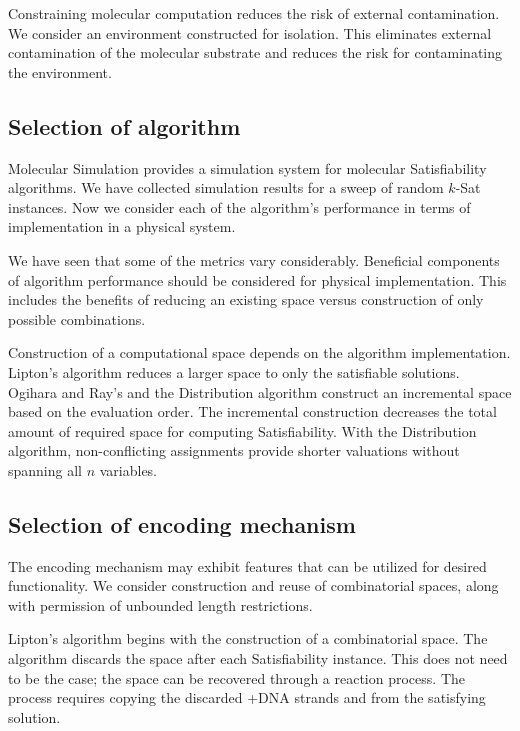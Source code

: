   Constraining molecular computation reduces the risk of external contamination.  We consider an environment constructed for isolation.  This eliminates external contamination of the molecular substrate and reduces the risk for contaminating the environment.

			
		\subsection{Selection of algorithm}
		
Molecular Simulation provides a simulation system for molecular {\sc Satisfiability} algorithms.  We have collected simulation results for a sweep of random $k$-{\sc Sat} instances.  Now we consider each of the algorithm's performance in terms of implementation in a physical system.
			
We have seen that some of the metrics vary considerably.  Beneficial components of algorithm performance should be considered for physical implementation.  This includes the benefits of reducing an existing space versus construction of only possible combinations.
		
Construction of a computational space depends on the algorithm implementation.  Lipton's algorithm reduces a larger space to only the satisfiable solutions.  Ogihara and Ray's and the Distribution algorithm construct an incremental space based on the evaluation order.  The incremental construction decreases the total amount of required space for computing {\sc Satisfiability}.  With the Distribution algorithm, non-conflicting assignments provide shorter valuations without spanning all $n$ variables.
			
		\subsection{Selection of encoding mechanism}
		
The encoding mechanism may exhibit features that can be utilized for desired functionality.  We consider construction and reuse of combinatorial spaces, along with permission of unbounded length restrictions.

Lipton's algorithm begins with the construction of a combinatorial space. The algorithm discards the space after each {\sc Satisfiability} instance.  This does not need to be the case; the space can be recovered through a reaction process.  The process requires copying the discarded +DNA strands and from the satisfying solution.
			
